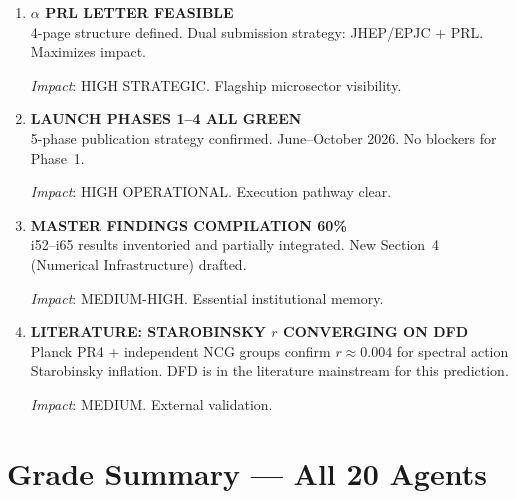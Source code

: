 \documentclass[11pt,a4paper]{article}
\begin{document}
\begin{enumerate}[label=\textbf{\arabic*.}, leftmargin=1.5cm]
\textit{Impact}: HIGHEST OPERATIONAL. First external visibility imminent.

\item \textbf{$\alpha$ PRL LETTER FEASIBLE}\\
4-page structure defined. Dual submission strategy: JHEP/EPJC + PRL. Maximizes impact.

\textit{Impact}: HIGH STRATEGIC. Flagship microsector visibility.

\item \textbf{LAUNCH PHASES 1--4 ALL GREEN}\\
5-phase publication strategy confirmed. June--October 2026. No blockers for Phase~1.

\textit{Impact}: HIGH OPERATIONAL. Execution pathway clear.

\item \textbf{MASTER FINDINGS COMPILATION 60\%}\\
i52--i65 results inventoried and partially integrated. New Section~4 (Numerical Infrastructure) drafted.

\textit{Impact}: MEDIUM-HIGH. Essential institutional memory.

\item \textbf{LITERATURE: STAROBINSKY $r$ CONVERGING ON DFD}\\
Planck PR4 + independent NCG groups confirm $r \approx 0.004$ for spectral action Starobinsky inflation. DFD is in the literature mainstream for this prediction.

\textit{Impact}: MEDIUM. External validation.

\end{enumerate}


\section{Grade Summary --- All 20 Agents}
\label{sec:grades}
\end{document}
